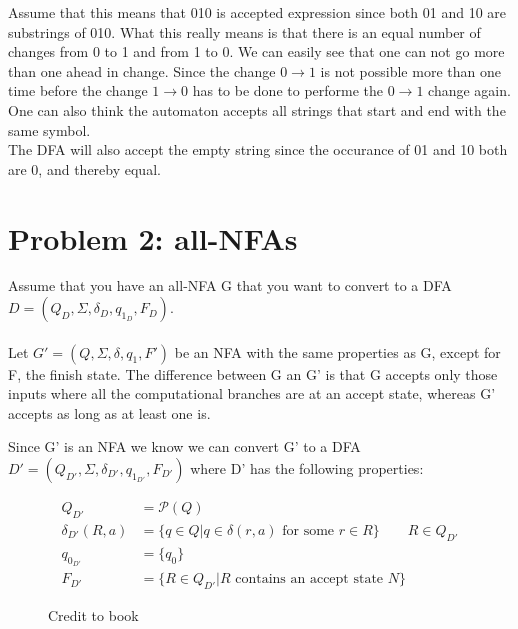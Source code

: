\documentclass{article}
\begin{document}
Assume that this means that 010 is accepted expression since both 01 and 10 are substrings of 010.
What this really means is that there is an equal number of changes from 0 to 1 and from 1 to 0. We can easily see that one can not go more than one ahead in change. Since the change $0 \rightarrow 1$ is not possible more than one time before the change $1\rightarrow 0$ has to  be done to performe the $0 \rightarrow 1$ change again. One can also think the automaton accepts all strings that start and end with the same symbol. \\
The DFA will also accept the empty string since the occurance of 01 and 10 both are 0, and thereby equal.
\begin{center}
\end{center}


\section{Problem 2: all-NFAs}
Assume that you have an all-NFA G that you want to convert to a DFA $D = (Q_D, \Sigma, \delta_D, q_{1_D}, F_D)$. \\ \ \\
Let $G' = (Q, \Sigma , \delta, q_1, F')$ be an NFA with the same properties as G, except for F, the finish state. The difference between G an G' is that G accepts only those inputs where all the computational branches are at an accept state, whereas G' accepts as long as at least one is.

Since G' is an NFA we know we can convert G' to a DFA $D' = (Q_{D'}, \Sigma, \delta_{D'}, q_{1_{D'}}, F_{D'})$ where D' has the following properties:
\begin{figure}[H]
\begin{align*}
  Q_{D'} &= \mathcal{P}(Q)\\
  \delta_{D'}(R, a) &= \{q\in Q | q \in \delta(r, a) \text{ for some } r \in R \} \qquad R \in Q_{D'} \\
  q_{0_{D'}} &= \{q_0\} \\
  F_{D'} &= \{R \in Q_{D'} | R \text{ contains an accept state }N \}
\end{align*}
\caption{Credit to book}
\end{figure}
\end{document}
